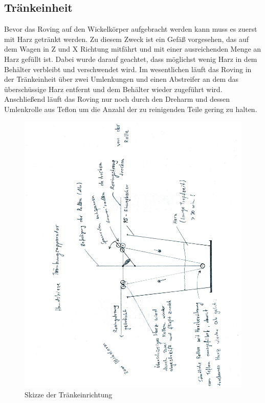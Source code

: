 \documentclass[paper=A4,pagesize,DIV=18, 12pt,listof=totoc,bibliography=totoc,headings=optiontohead,open=any]{article}
\begin{document}
\subsection{Tränkeinheit}
Bevor das Roving auf den Wickelkörper aufgebracht werden kann muss es zuerst mit Harz getränkt werden. Zu diesem Zweck ist ein Gefäß vorgesehen, das auf dem Wagen in Z und X Richtung mitfährt und mit einer ausreichenden Menge an Harz gefüllt ist. Dabei wurde darauf geachtet, dass möglichst wenig Harz in dem Behälter verbleibt und verschwendet wird. Im wesentlichen läuft das Roving in der Tränkeinheit über zwei Umlenkungen und einen Abstreifer an dem das überschüssige Harz entfernt und dem Behälter wieder zugeführt wird. Anschließend läuft das Roving nur noch durch den Dreharm und dessen Umlenkrolle aus Teflon um die Anzahl der zu reinigenden Teile gering zu halten.
\begin{figure}[H]
	\centering
	\includegraphics[angle=270, width=1\textwidth]{bilder/skizze.jpg}
	\caption{Skizze der Tränkeinrichtung} 
	\label{fig:123}
\end{figure}
\end{document}
